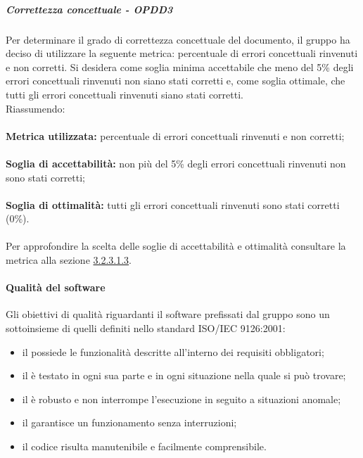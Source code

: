 \documentclass[PianoDiQualifica.tex]{subfiles}
\begin{document}
				\subparagraph{Correttezza concettuale - OPDD3}
				Per determinare il grado di correttezza concettuale del documento, il gruppo ha deciso di utilizzare la seguente metrica: percentuale di errori concettuali rinvenuti e non corretti.
				Si desidera come soglia minima accettabile che meno del 5\% degli errori concettuali rinvenuti non siano stati corretti e, come soglia ottimale, che tutti gli errori
				concettuali rinvenuti siano stati corretti.\\
				Riassumendo: \\ \\
				\textbf{Metrica utilizzata:} percentuale di errori concettuali rinvenuti e non corretti; \\ \\
				\textbf{Soglia di accettabilità:} non più del 5\% degli errori concettuali rinvenuti non sono stati corretti;\\ \\
				\textbf{Soglia di ottimalità:} tutti gli errori concettuali rinvenuti sono stati corretti (0\%). \\ \\
				Per approfondire la scelta delle soglie di accettabilità e ottimalità consultare la metrica alla sezione \hyperlink{err_concettuali}{3.2.3.1.3}.
				
			\paragraph{Qualità del software}
			Gli obiettivi di qualità riguardanti il software prefissati dal gruppo \GRUPPO{} sono un sottoinsieme di quelli definiti nello standard ISO/IEC 9126:2001:
			\begin{itemize}
				\item il  possiede le funzionalità descritte all’interno dei requisiti obbligatori;
				\item il  è testato in ogni sua parte e in ogni situazione nella quale si può trovare;
				\item il  è robusto e non interrompe l’esecuzione in seguito a situazioni anomale;
				\item il  garantisce un funzionamento senza interruzioni;
				\item il codice risulta manutenibile e facilmente comprensibile.
			\end{itemize}
			
\end{document}
